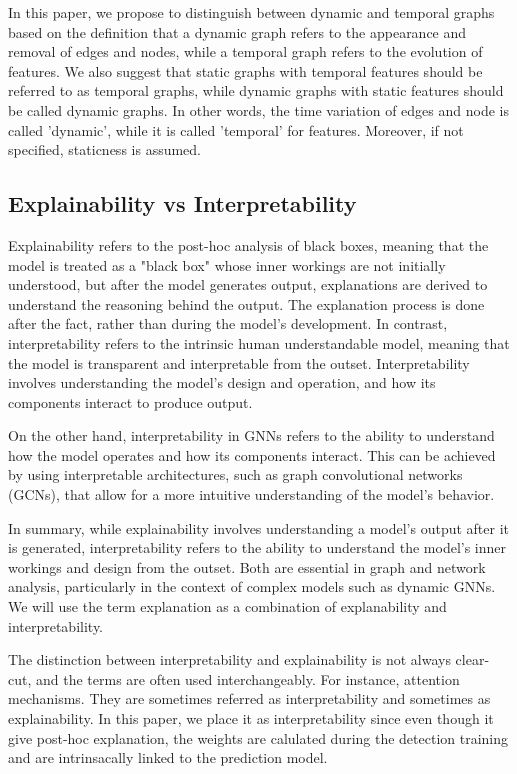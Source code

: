 In this paper, we propose to distinguish between dynamic and temporal graphs based on the definition that a dynamic graph refers to the appearance and removal of edges and nodes, while a temporal graph refers to the evolution of features. We also suggest that static graphs with temporal features should be referred to as temporal graphs, while dynamic graphs with static features should be called dynamic graphs. In other words, the time variation of edges and node is called 'dynamic', while it is called 'temporal' for features. Moreover, if not specified, staticness is assumed.

\subsection{Explainability vs Interpretability}

Explainability refers to the post-hoc analysis of black boxes, meaning that the model is treated as a "black box" whose inner workings are not initially understood, but after the model generates output, explanations are derived to understand the reasoning behind the output. The explanation process is done after the fact, rather than during the model's development. In contrast, interpretability refers to the intrinsic human understandable model, meaning that the model is transparent and interpretable from the outset. Interpretability involves understanding the model's design and operation, and how its components interact to produce output.\cite{trustworthy}

On the other hand, interpretability in GNNs refers to the ability to understand how the model operates and how its components interact. This can be achieved by using interpretable architectures, such as graph convolutional networks (GCNs), that allow for a more intuitive understanding of the model's behavior.

In summary, while explainability involves understanding a model's output after it is generated, interpretability refers to the ability to understand the model's inner workings and design from the outset. Both are essential in graph and network analysis, particularly in the context of complex models such as dynamic GNNs. We will use the term explanation as a combination of explanability and interpretability.

The distinction between interpretability and explainability is not always clear-cut, and the terms are often used interchangeably.  For instance, attention mechanisms. They are sometimes referred as interpretability and sometimes as explainability. In this paper, we place it as interpretability since even though it give post-hoc explanation, the weights are calulated during the detection training and are intrinsacally linked to the prediction model.



